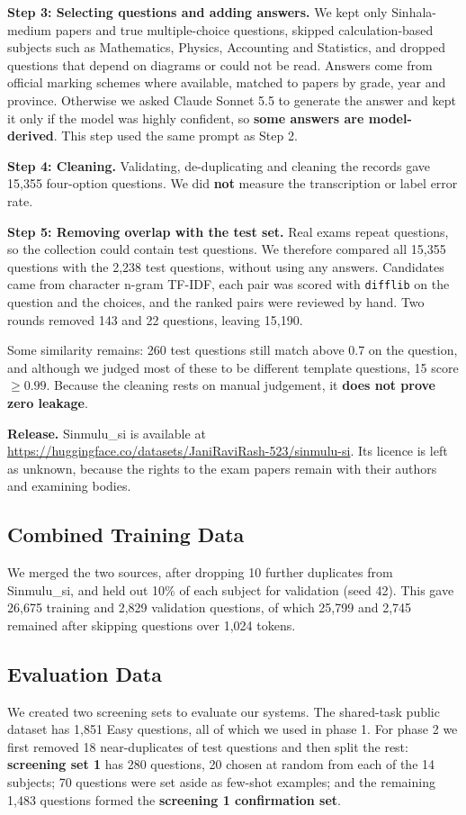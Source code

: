 \documentclass[11pt]{article}
\newcommand{\para}[1]{\smallskip\noindent\textbf{#1}\enspace}
\newcommand{\sinmulu}{Sinmulu\_si}
\begin{document}
\para{Step 3: Selecting questions and adding answers.} We kept only Sinhala-medium papers and true multiple-choice questions, skipped calculation-based subjects such as Mathematics, Physics, Accounting and Statistics, and dropped questions that depend on diagrams or could not be read. Answers come from official marking schemes where available, matched to papers by grade, year and province. Otherwise we asked Claude Sonnet 5.5 to generate the answer and kept it only if the model was highly confident, so \textbf{some answers are model-derived}. This step used the same prompt as Step 2.

\para{Step 4: Cleaning.} Validating, de-duplicating and cleaning the records gave 15,355 four-option questions. We did \textbf{not} measure the transcription or label error rate.

\para{Step 5: Removing overlap with the test set.} Real exams repeat questions, so the collection could contain test questions. We therefore compared all 15,355 questions with the 2,238 test questions, without using any answers. Candidates came from character n-gram TF-IDF, each pair was scored with \texttt{difflib} on the question and the choices, and the ranked pairs were reviewed by hand. Two rounds removed 143 and 22 questions, leaving 15,190.

Some similarity remains: 260 test questions still match above 0.7 on the question, and although we judged most of these to be different template questions, 15 score $\geq 0.99$. Because the cleaning rests on manual judgement, it \textbf{does not prove zero leakage}.

\para{Release.} \sinmulu{} is available at \url{https://huggingface.co/datasets/JaniRaviRash-523/sinmulu-si}. Its licence is left as unknown, because the rights to the exam papers remain with their authors and examining bodies.

\subsection{Combined Training Data}
We merged the two sources, after dropping 10 further duplicates from \sinmulu{}, and held out 10\% of each subject for validation (seed 42). This gave 26,675 training and 2,829 validation questions, of which 25,799 and 2,745 remained after skipping questions over 1,024 tokens.

\subsection{Evaluation Data}\label{sec:evaldata}
We created two screening sets to evaluate our systems. The shared-task public dataset has 1,851 Easy questions, all of which we used in phase 1. For phase 2 we first removed 18 near-duplicates of test questions and then split the rest: \textbf{screening set 1} has 280 questions, 20 chosen at random from each of the 14 subjects; 70 questions were set aside as few-shot examples; and the remaining 1,483 questions formed the \textbf{screening 1 confirmation set}.
\end{document}
